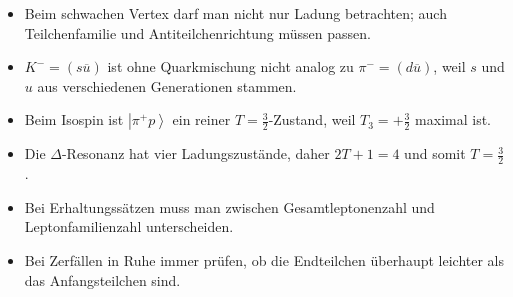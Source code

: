 \documentclass[11pt,a4paper]{scrartcl}
\newcommand{\ket}[1]{\left| #1 \right\rangle}
\theoremstyle{definition}
\theoremstyle{plain}
\theoremstyle{remark}
\begin{document}
\begin{warningbox}[title=Typische Fehler]
\begin{itemize}
    \item Beim schwachen Vertex darf man nicht nur Ladung betrachten; auch Teilchenfamilie und Antiteilchenrichtung müssen passen.
    \item $K^-=(s\overline u)$ ist ohne Quarkmischung nicht analog zu $\pi^-=(d\overline u)$, weil $s$ und $u$ aus verschiedenen Generationen stammen.
    \item Beim Isospin ist $\ket{\pi^+p}$ ein reiner $T=\frac32$-Zustand, weil $T_3=+\frac32$ maximal ist.
    \item Die $\Delta$-Resonanz hat vier Ladungszustände, daher $2T+1=4$ und somit $T=\frac32$.
    \item Bei Erhaltungssätzen muss man zwischen Gesamtleptonenzahl und Leptonfamilienzahl unterscheiden.
    \item Bei Zerfällen in Ruhe immer prüfen, ob die Endteilchen überhaupt leichter als das Anfangsteilchen sind.
\end{itemize}
\end{warningbox}
\end{document}
